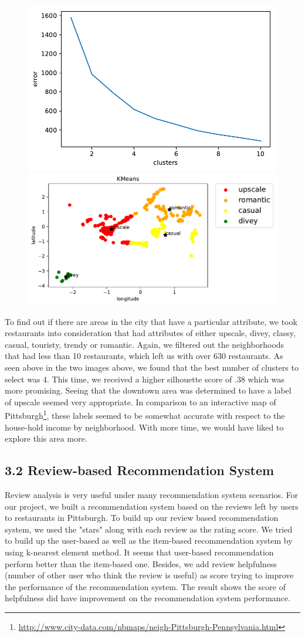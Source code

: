\documentclass{neu_handout}
\begin{document}
\begin{figure}[h]
\centering
{
\includegraphics[width=0.38\linewidth]{error_kmeans_attributes}
}
{
\includegraphics[width=0.5\linewidth]{kmeans_attributes}
}
\end{figure}


To find out if there are areas in the city that have a particular attribute, we took restaurants into consideration that had attributes of either upscale, divey, classy, casual, touristy, trendy or romantic. Again, we filtered out the neighborhoods that had less than 10 restaurants, which left us with over 630 restaurants. As seen above in the two images above, we found that the best number of clusters to select was 4. This time, we received a higher silhouette score of .38 which was more promising. Seeing that the downtown area was determined to have a label of upscale seemed very appropriate. In comparison to an interactive map of Pittsburgh\footnote{\url{http://www.city-data.com/nbmaps/neigh-Pittsburgh-Pennsylvania.html}}, these labels seemed to be somewhat accurate with respect to the house-hold income by neighborhood. With more time, we would have liked to explore this area more.


\subsection*{3.2 Review-based Recommendation System}
Review analysis is very useful under many recommendation system scenarios. For our project, we built a recommendation system based on the reviews left by users to restaurants in Pittsburgh. To build up our review based recommendation system, we used the "stars" along with each review as the rating score. We tried to build up the user-based as well as the item-based recommendation system by using k-nearest element method. It seems that user-based recommendation perform better than the item-based one. Besides, we add review helpfulness (number of other user who think the review is useful) as score trying to improve the performance of the recommendation system. The result shows the score of helpfulness did have improvement on the recommendation system performance.   
\end{document}
